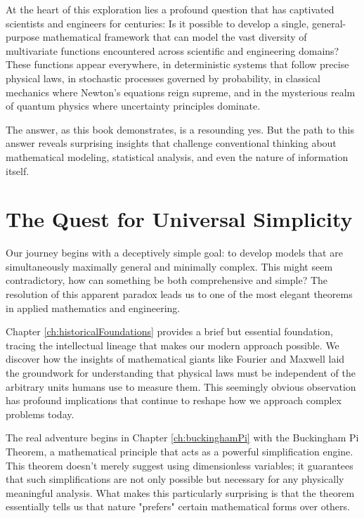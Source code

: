 \documentclass[
	11pt, %
	fleqn, %
	a4paper, %
]{LegrandOrangeBook}
\begin{document}
At the heart of this exploration lies a profound question that has captivated scientists and engineers for centuries: Is it possible to develop a single, general-purpose mathematical framework that can model the vast diversity of multivariate functions encountered across scientific and engineering domains? These functions appear everywhere, in deterministic systems that follow precise physical laws, in stochastic processes governed by probability, in classical mechanics where Newton's equations reign supreme, and in the mysterious realm of quantum physics where uncertainty principles dominate.

The answer, as this book demonstrates, is a resounding yes. But the path to this answer reveals surprising insights that challenge conventional thinking about mathematical modeling, statistical analysis, and even the nature of information itself.

\section{The Quest for Universal Simplicity}

Our journey begins with a deceptively simple goal: to develop models that are simultaneously maximally general and minimally complex. This might seem contradictory, how can something be both comprehensive and simple? The resolution of this apparent paradox leads us to one of the most elegant theorems in applied mathematics and engineering.

Chapter \ref{ch:historicalFoundations} provides a brief but essential foundation, tracing the intellectual lineage that makes our modern approach possible. We discover how the insights of mathematical giants like Fourier and Maxwell laid the groundwork for understanding that physical laws must be independent of the arbitrary units humans use to measure them. This seemingly obvious observation has profound implications that continue to reshape how we approach complex problems today.

The real adventure begins in Chapter \ref{ch:buckinghamPi} with the Buckingham Pi Theorem, a mathematical principle that acts as a powerful simplification engine. This theorem doesn't merely suggest using dimensionless variables; it guarantees that such simplifications are not only possible but necessary for any physically meaningful analysis. What makes this particularly surprising is that the theorem essentially tells us that nature "prefers" certain mathematical forms over others.
\end{document}

